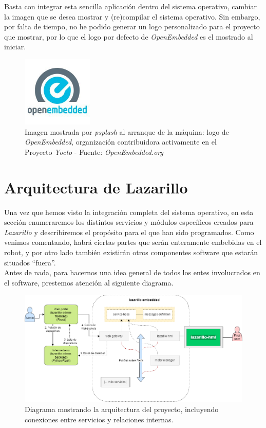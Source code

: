 Basta con integrar esta sencilla aplicación dentro del sistema operativo, cambiar la imagen que se desea mostrar y (re)compilar el sistema operativo. Sin embargo, por falta de tiempo, no he podido generar un logo personalizado para el proyecto que mostrar, por lo que el logo por defecto de \textit{OpenEmbedded} es el mostrado al iniciar.\\

\begin{figure}[h]
	\centering
	\includegraphics[width=0.3\textwidth]{imagenes/openembedded.jpg}
	\caption{Imagen mostrada por \textit{psplash} al arranque de la máquina: logo de \textit{OpenEmbedded}, organización contribuidora activamente en el Proyecto \textit{Yocto} - Fuente: \textit{OpenEmbedded.org} \cite{openembedded}}
\end{figure}


\section{Arquitectura de Lazarillo}

Una vez que hemos visto la integración completa del sistema operativo, en esta sección enumeraremos los distintos servicios y módulos específicos creados para \textit{Lazarillo} y describiremos el propósito para el que han sido programados. Como venimos comentando, habrá ciertas partes que serán enteramente embebidas en el robot, y por otro lado también existirán otros componentes software que estarán situados ``fuera''.\\





Antes de nada, para hacernos una idea general de todos los entes involucrados en el software, prestemos atención al siguiente diagrama.\\

\begin{figure}[h]
	\centering
	\includegraphics[width=\textwidth]{imagenes/lazarillo-architecture.png}
	\caption{Diagrama mostrando la arquitectura del proyecto, incluyendo conexiones entre servicios y relaciones internas.}
\end{figure}

